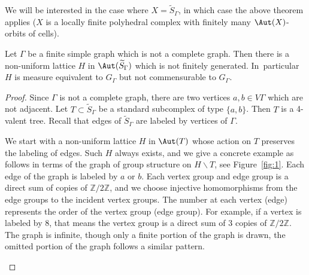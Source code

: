 We will be interested in the case where $X=\widetilde S_\Gamma$, in which case the above theorem applies (\ie $X$ is a locally finite polyhedral complex with finitely many $\Aut(X)$-orbits of cells).\enlargethispage{\baselineskip}%

\begin{prop}\label{prop:lattice}
Let $\Gamma$ be a finite simple graph which is not a complete graph. Then there is a non-uniform lattice $H$ in $\Aut(\widetilde S_\Gamma)$ which is not finitely generated. In~particular $H$ is measure equivalent to $G_\Gamma$ but not commensurable to $G_\Gamma$.
\end{prop}

\begin{proof}
Since $\Gamma$ is not a complete graph, there are two vertices $a,b\in V\Gamma$ which are not adjacent. Let $T\subset \widetilde S_\Gamma$ be a standard subcomplex of type $\{a,b\}$. Then $T$ is a 4-valent tree. Recall that edges of $\widetilde S_\Gamma$ are labeled by vertices of $\Gamma$.

We start with a non-uniform lattice $H$ in $\Aut(T)$ whose action on $T$ preserves the labeling of edges. Such $H$ always exists, and we give a concrete example as follows in terms of the graph of group structure on $H\backslash T$, see Figure~\ref{fig:1}. Each edge of the graph is labeled by $a$ or $b$. Each vertex group and edge group is a direct sum of copies of $\mathbb Z/2\mathbb Z$, and we choose injective homomorphisms from the edge groups to the incident vertex groups. The number at each vertex (\resp edge) represents the order of the vertex group (\resp edge group). For example, if a vertex is labeled by $8$, that means the vertex group is a direct sum of 3 copies of $\mathbb Z/2\mathbb Z$. The graph is infinite, though only a finite portion of the graph is drawn, the omitted portion of the graph follows a similar pattern.
\begin{figure}
\smaller\smaller
{}
\end{figure}
\end{proof}
